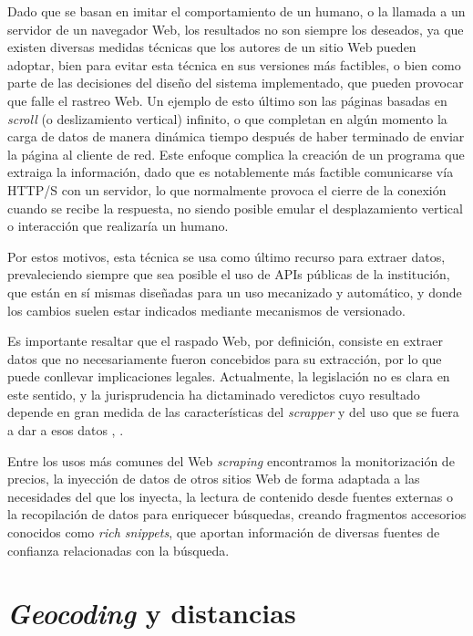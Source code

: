 Dado que se basan en imitar el comportamiento de un humano, o la llamada a un servidor de un navegador Web, los resultados no son siempre los deseados, ya que existen diversas medidas técnicas que los autores de un sitio Web pueden adoptar, bien para evitar esta técnica en sus versiones más factibles, o bien como parte de las decisiones del diseño del sistema implementado, que pueden provocar que falle el rastreo Web. Un ejemplo de esto último son las páginas basadas en \textit{scroll} (o deslizamiento vertical) infinito, o que completan en algún momento la carga de datos de manera dinámica tiempo después de haber terminado de enviar la página al cliente de red. Este enfoque complica la creación de un programa que extraiga la información, dado que es notablemente más factible comunicarse vía HTTP/S con un servidor, lo que normalmente provoca el cierre de la conexión cuando se recibe la respuesta, no siendo posible emular el desplazamiento vertical o interacción que realizaría un humano.

Por estos motivos, esta técnica se usa como último recurso para extraer datos, prevaleciendo siempre que sea posible el uso de APIs públicas de la institución, que están en sí mismas diseñadas para un uso mecanizado y automático, y donde los cambios suelen estar indicados mediante mecanismos de versionado.

Es importante resaltar que el raspado Web, por definición, consiste en extraer datos que no necesariamente fueron concebidos para su extracción, por lo que puede conllevar implicaciones legales. Actualmente, la legislación no es clara en este sentido, y la jurisprudencia ha dictaminado veredictos cuyo resultado depende en gran medida de las características del \textit{scrapper} y del uso que se fuera a dar a esos datos \cite{scraping_legal}, \cite{ryanair}.

Entre los usos más comunes del Web \textit{scraping} encontramos la monitorización de precios, la inyección de datos de otros sitios Web de forma adaptada a las necesidades del que los inyecta, la lectura de contenido desde fuentes externas o la recopilación de datos para enriquecer búsquedas, creando fragmentos accesorios conocidos como \textit{rich snippets}, que aportan información de diversas fuentes de confianza relacionadas con la búsqueda.

\section{\textit{Geocoding} y distancias}

